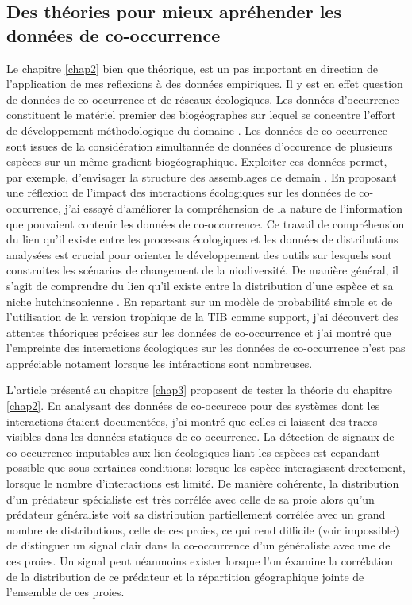 \subsection*{Des théories pour mieux apréhender les données de
co-occurrence}\label{des-thuxe9ories-pour-mieux-apruxe9hender-les-donnuxe9es-de-co-occurrence}

Le chapitre \ref{chap2} bien que théorique, est un pas important en
direction de l'application de mes reflexions à des données empiriques.
Il y est en effet question de données de co-occurrence et de réseaux
écologiques. Les données d'occurrence constituent le matériel premier
des biogéographes sur lequel se concentre l'effort de développement
méthodologique du domaine \citep{Elith2006, Phillips2006, Pollock2014}.
Les données de co-occurrence sont issues de la considération simultannée
de données d'occurence de plusieurs espèces sur un même gradient
biogéographique. Exploiter ces données permet, par exemple, d'envisager
la structure des assemblages de demain \citep{Albouy2012}. En proposant
une réflexion de l'impact des interactions écologiques sur les données
de co-occurrence, j'ai essayé d'améliorer la compréhension de la nature
de l'information que pouvaient contenir les données de co-occurrence. Ce
travail de compréhension du lien qu'il existe entre les processus
écologiques et les données de distributions analysées est crucial pour
orienter le développement des outils sur lesquels sont construites les
scénarios de changement de la niodiversité. De manière général, il
s'agit de comprendre du lien qu'il existe entre la distribution d'une
espèce et sa niche hutchinsonienne \citep{Pulliam2000, Godsoe2010a}. En
repartant sur un modèle de probabilité simple et de l'utilisation de la
version trophique de la TIB \citep{Gravel2011} comme support, j'ai
découvert des attentes théoriques précises sur les données de
co-occurrence et j'ai montré que l'empreinte des interactions
écologiques sur les données de co-occurrence n'est pas appréciable
notament lorsque les intéractions sont nombreuses.

L'article présenté au chapitre \ref{chap3} proposent de tester la
théorie du chapitre \ref{chap2}. En analysant des données de co-occurece
pour des systèmes dont les interactions étaient documentées, j'ai montré
que celles-ci laissent des traces visibles dans les données statiques de
co-occurrence. La détection de signaux de co-occurrence imputables aux
lien écologiques liant les espèces est cepandant possible que sous
certaines conditions: lorsque les espèce interagissent drectement,
lorsque le nombre d'interactions est limité. De manière cohérente, la
distribution d'un prédateur spécialiste est très corrélée avec celle de
sa proie alors qu'un prédateur généraliste voit sa distribution
partiellement corrélée avec un grand nombre de distributions, celle de
ces proies, ce qui rend difficile (voir impossible) de distinguer un
signal clair dans la co-occurrence d'un généraliste avec une de ces
proies. Un signal peut néanmoins exister lorsque l'on éxamine la
corrélation de la distribution de ce prédateur et la répartition
géographique jointe de l'ensemble de ces proies.

